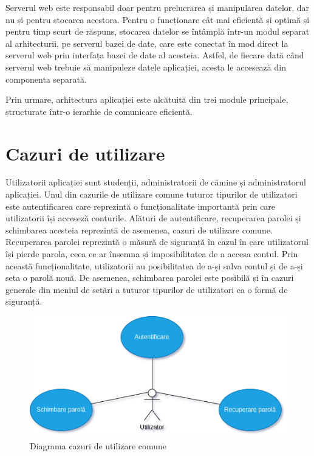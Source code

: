 \documentclass[12pt,a4paper]{report}
\theoremstyle{definition}
\theoremstyle{remark}
\begin{document}
\par Serverul web este responsabil doar pentru prelucrarea și manipularea datelor, dar nu și pentru stocarea acestora. Pentru o funcționare cât mai eficientă și optimă și pentru timp scurt de răspuns, stocarea datelor se întâmplă într-un modul separat al arhitecturii, pe serverul bazei de date, care este conectat în mod direct la serverul web prin interfața bazei de date al acesteia. Astfel, de fiecare dată când serverul web trebuie să manipuleze datele aplicației, acesta le accesează  din componenta separată.

\par Prin urmare, arhitectura aplicației este alcătuită din trei module principale, structurate într-o ierarhie de comunicare eficientă.

\section{Cazuri de utilizare}
\par Utilizatorii aplicației sunt studenții, administratorii de cămine și administratorul aplicației. Unul din cazurile de utilizare comune tuturor tipurilor de utilizatori este autentificarea care reprezintă o funcționalitate importantă prin care utilizatorii își acceseză conturile. Alături de autentificare, recuperarea parolei și schimbarea acesteia reprezintă de asemenea, cazuri de utilizare comune. Recuperarea parolei reprezintă o măsură de siguranță în cazul în care utilizatorul își pierde parola, ceea ce ar însemna și imposibilitatea de a accesa contul. Prin această funcționalitate, utilizatorii au posibilitatea de a-și salva contul și de a-și seta o parolă nouă. De asemenea, schimbarea parolei este posibilă și în cazuri generale din meniul de setări a tuturor tipurilor de utilizatori ca o formă de siguranță.

\begin{figure}[H]
    \centering
    \includegraphics[width=0.75\linewidth]{resurse/diagrame/utilizator.drawio.png}
    \caption{Diagrama cazuri de utilizare comune}
\end{figure}
\end{document}
